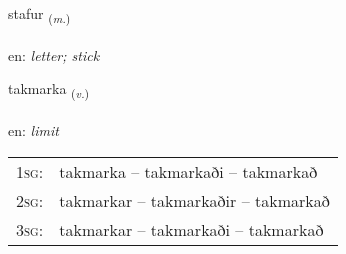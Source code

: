 \documentclass[frontgrid, backgrid]{flacards}\usepackage[]{graphicx}\usepackage[]{color}
\begin{document}
\renewcommand{\flhead}{\vskip5pt \fboxsep=0pt {\small\bfseries\footnotesize Nafnorð | Noun}}
\renewcommand{\fcfoot}{\vskip5pt \fboxsep=0pt \hspace{2pt}{\small\bfseries\footnotesize 2K}}

\renewcommand{\blhead}{\vskip5pt {\small\bfseries\footnotesize Nafnorð | Noun }}
\renewcommand{\bcfoot}{\vskip5pt \hspace{2pt}{\small\bfseries\footnotesize 2K}}


{stafur \small{\textsubscript{(\textit{m.})}} \\[1ex] %
\textphonetic{[staːvʏr]} \\
en: \emph{letter; stick} \\  [2ex]
\renewcommand*{\arraystretch}{0.8}
}

\renewcommand{\flhead}{\vskip5pt \fboxsep=0pt {\small\bfseries\footnotesize Sagnorð | Verb}}
\renewcommand{\fcfoot}{\vskip5pt \fboxsep=0pt \hspace{2pt}{\small\bfseries\footnotesize 2K}}

\renewcommand{\blhead}{\vskip5pt {\small\bfseries\footnotesize Sagnorð | Verb }}
\renewcommand{\bcfoot}{\vskip5pt \hspace{2pt}{\small\bfseries\footnotesize 2K}}


{takmarka \small{\textsubscript{(\textit{v.})}} \\[1ex] %
\textphonetic{[tʰakmar̥ka]} \\
en: \emph{limit} \\  [2ex]
\renewcommand*{\arraystretch}{0.8}
\begin{tabular}{p{1cm}l}
\textsc{1sg}: & takmarka -- takmarkaði -- takmarkað \\ 
\textsc{2sg}: & takmarkar -- takmarkaðir -- takmarkað \\ 
\textsc{3sg}: & takmarkar -- takmarkaði -- takmarkað \\ 
\end{tabular}
}
\end{document}
